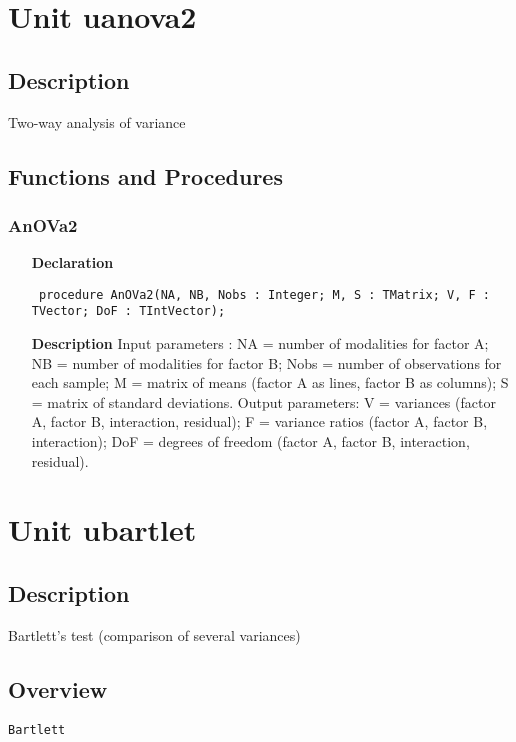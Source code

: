 \documentclass[12pt,a4paper,oneside]{report}
\newcommand{\declarationitem}[1]{\textbf{#1}}
\newcommand{\descriptiontitle}[1]{\textbf{#1}}
\newcommand{\code}[1]{\texttt{#1}}
\begin{document}
\section{Unit uanova2}
\label{uanova2}
\subsection{Description}
Two{-}way analysis of variance 
\subsection{Functions and Procedures}
\subsubsection{AnOVa2}
\label{uanova2-AnOVa2}
\begin{itemize}\item[\declarationitem{Declaration}\hfill]
	\begin{flushleft}
		\code{
			procedure AnOVa2(NA, NB, Nobs : Integer; M, S : TMatrix; V, F : TVector; DoF : TIntVector);}
	\end{flushleft}
	\item[\descriptiontitle{Description}]
	Input parameters : NA = number of modalities for factor A; NB = number of modalities for factor B; Nobs = number of observations for each sample; M = matrix of means (factor A as lines, factor B as columns); S = matrix of standard deviations. Output parameters: V = variances (factor A, factor B, interaction, residual); F = variance ratios (factor A, factor B, interaction); DoF = degrees of freedom (factor A, factor B, interaction, residual).
\end{itemize}
\section{Unit ubartlet}
\label{ubartlet}
\subsection{Description}
Bartlett's test (comparison of several variances) 
\subsection{Overview}
\begin{description}
	\item[\texttt{Bartlett}]
\end{description}
\end{document}
